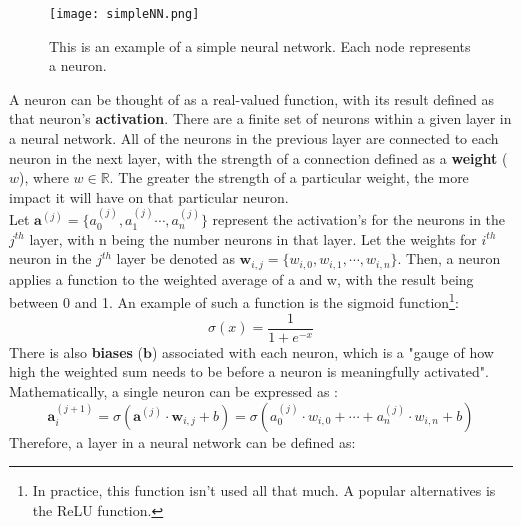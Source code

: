 \documentclass[12pt]{article}
\begin{document}
\begin{figure}[h]
    \centering
    \texttt{[image: simpleNN.png]}
    \caption{This is an example of a simple neural network\cite{nielsen2015NN}. Each node represents a neuron.}
    \label{fig:simpleNN}
\end{figure}
A neuron can be thought of as a real-valued function, with its result defined as that neuron's \textbf{activation}\cite{3blue1brown}. There are a finite set of neurons within a given layer in a neural network. All of the neurons in the previous layer are connected to each neuron in the next layer, with the strength of a connection defined as a \textbf{weight} ($w$), where $w\in\mathbb{R}$. The greater the strength of a particular weight, the more impact it will have on that particular neuron.\\ 
\newline
Let $\bm{a}^{(j)}=\{a_0^{(j)},a_1^{(j)}\cdots,a_n^{(j)}\}$ represent the activation's for the neurons in the $j^{th}$ layer, with n being the number neurons in that layer. Let the weights for $i^{th}$  neuron in the $j^{th}$ layer be denoted as $\bm{w}_{i,j} = \{w_{i,0},w_{i,1},\cdots,w_{i,n}\}$. Then, a neuron applies a function to the weighted average of a and w, with the result being between 0 and 1\cite{nielsen2015NN}. An example of such a function is the sigmoid function\footnote{In practice, this function isn't used all that much. A popular alternatives is the ReLU function\cite{goodfellow2016deep}.}: 
\[\sigma(x) = \frac{1}{1+e^{-x}}\]
There is also \textbf{biases} ($\bm{b}$) associated with each neuron, which is a "gauge of how high the weighted sum needs to be before a neuron is meaningfully activated"\cite{3blue1brown}. Mathematically, a single neuron can be expressed as \cite{nielsen2015NN} : 
$$\bm{a}^{(j+1)}_i = \sigma(\bm{a}^{(j)}\cdot \bm{w}_{i,j} + b)=\sigma(a_0^{(j)}\cdot w_{i,0} + \cdots + a_n^{(j)} \cdot w_{i,n} + b)$$
Therefore, a layer in a neural network can be defined as\cite{nielsen2015NN}:
\end{document}
